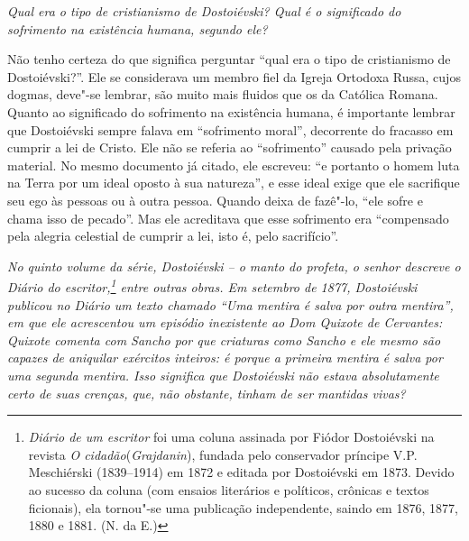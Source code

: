 \medskip

\emph{Qual era o tipo de cristianismo de Dostoiévski? Qual é o significado
do sofrimento na existência humana, segundo ele?}

Não tenho certeza do que significa perguntar ``qual era o tipo de
cristianismo de Dostoiévski?''. Ele se considerava um membro fiel da
Igreja Ortodoxa Russa, cujos dogmas, deve"-se lembrar, são muito mais
fluidos que os da Católica Romana. Quanto ao significado do sofrimento
na existência humana, é importante lembrar que Dostoiévski sempre falava
em ``sofrimento moral'', decorrente do fracasso em cumprir a lei de
Cristo. Ele não se referia ao ``sofrimento'' causado pela privação
material. No mesmo documento já citado, ele escreveu: ``e portanto o homem
luta na Terra por um ideal oposto à sua natureza'', e esse
ideal exige que ele sacrifique seu ego às pessoas ou à outra pessoa.
Quando deixa de fazê"-lo, ``ele sofre e chama isso de pecado''. Mas ele
acreditava que esse sofrimento era ``compensado pela alegria celestial de
cumprir a lei, isto é, pelo sacrifício''.

\medskip

\emph{No quinto volume da série, \emph{Dostoiévski -- o manto do profeta}, o
senhor descreve o \emph{Diário do escritor},\footnote{\emph{Diário de um escritor} foi uma coluna assinada por Fiódor Dostoiévski na revista \emph{O cidadão}(\emph{Grajdanin}), fundada pelo conservador príncipe V.P. Meschiérski (1839--1914) em 1872 e editada por Dostoiévski em 1873. Devido ao sucesso da coluna (com ensaios literários e políticos, crônicas e textos ficionais), ela tornou"-se uma publicação independente, saindo em 1876, 1877, 1880 e 1881. (N. da E.)} entre outras obras.
Em setembro de 1877, Dostoiévski publicou no \emph{Diário} um texto
chamado ``Uma mentira é salva por outra mentira'', em que ele acrescentou
um episódio inexistente ao \emph{Dom Quixote} de Cervantes: Quixote comenta
com Sancho por que criaturas como Sancho e ele mesmo são capazes de aniquilar exércitos
inteiros: é porque a primeira mentira é salva por uma segunda mentira.
Isso significa que Dostoiévski não estava absolutamente certo de suas
crenças, que, não obstante, tinham de ser mantidas vivas?}

